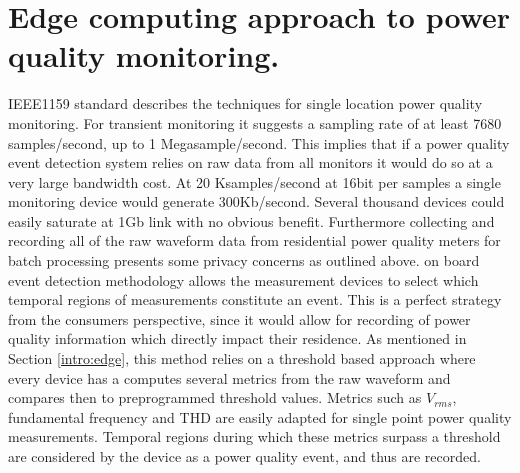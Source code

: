 \section{Edge computing approach to power quality monitoring.}

IEEE1159 standard describes the techniques for single location power quality monitoring. For transient monitoring it suggests a sampling rate of at least 7680 samples/second, up to 1 Megasample/second. This implies that if a power quality event detection system relies on raw data from all monitors it would do so at a very large bandwidth cost. At 20 Ksamples/second at 16bit per samples a single monitoring device would generate 300Kb/second. Several thousand devices could easily saturate at 1Gb link with no obvious benefit. Furthermore collecting and recording all of the raw waveform data from residential power quality meters for batch processing presents some privacy concerns as outlined above. on board event detection methodology allows the measurement devices to select which temporal regions of measurements constitute an event. This is a perfect strategy from the consumers perspective, since it would allow for recording of power quality information which directly impact their residence. As mentioned in Section \ref{intro:edge}, this method relies on a threshold based approach where every device has a computes several metrics from the raw waveform and compares then to preprogrammed threshold values. Metrics such as $V_{rms}$, fundamental frequency and THD are easily adapted for single point power quality measurements. Temporal regions during which these metrics surpass a threshold are considered by the device as a power quality event, and thus are recorded. 

